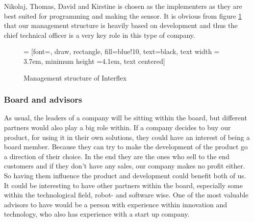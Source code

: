 Nikolaj, Thomas, David and Kirstine is chosen as the implementers as they are best suited for programming and making the sensor.
It is obvious from figure \ref{management_structure} that our management structure is heavily based on development and thus the chief technical officer is a very key role in this type of company.

\begin{figure}[ht]
\centering
     = [font=\footnotesize, draw, rectangle, fill=blue!10, text=black, text width = 3.7em, minimum height =4.1em, text centered]
  \caption{Management structure of Interflex}
  \label{management_structure}
\end{figure}


\subsubsection{Board and advisors}
As usual, the leaders of a company will be sitting within the board, but different partners would also play a big role within. If a company decides to buy our product, for using it in their own solutions, they could have an interest of being a board member. Because they can try to make the development of the product go a direction of their choice. In the end they are the ones who sell to the end customers and if they don't have any sales, our company makes no profit either. So having them influence the product and development could benefit both of us. 
It could be interesting to have other partners within the board, especially some within the technological field, robot- and software wise.
One of the most valuable advisors to have would be a person with experience within innovation and technology, who also has experience with a start up company. 

